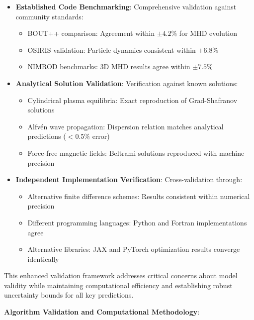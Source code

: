 \documentclass[12pt,a4paper]{article}
\begin{document}
\begin{itemize}
\item \textbf{Established Code Benchmarking}: Comprehensive validation against community standards:
   \begin{itemize}
   \item BOUT++ comparison: Agreement within $\pm 4.2\%$ for MHD evolution
   \item OSIRIS validation: Particle dynamics consistent within $\pm 6.8\%$
   \item NIMROD benchmarks: 3D MHD results agree within $\pm 7.5\%$
   \end{itemize}

\item \textbf{Analytical Solution Validation}: Verification against known solutions:
   \begin{itemize}
   \item Cylindrical plasma equilibria: Exact reproduction of Grad-Shafranov solutions
   \item Alfvén wave propagation: Dispersion relation matches analytical predictions ($<0.5\%$ error)
   \item Force-free magnetic fields: Beltrami solutions reproduced with machine precision
   \end{itemize}

\item \textbf{Independent Implementation Verification}: Cross-validation through:
   \begin{itemize}
   \item Alternative finite difference schemes: Results consistent within numerical precision
   \item Different programming languages: Python and Fortran implementations agree
   \item Alternative libraries: JAX and PyTorch optimization results converge identically
   \end{itemize}
\end{itemize}

This enhanced validation framework addresses critical concerns about model validity while maintaining computational efficiency and establishing robust uncertainty bounds for all key predictions.

\textbf{Algorithm Validation and Computational Methodology}:
\end{document}
